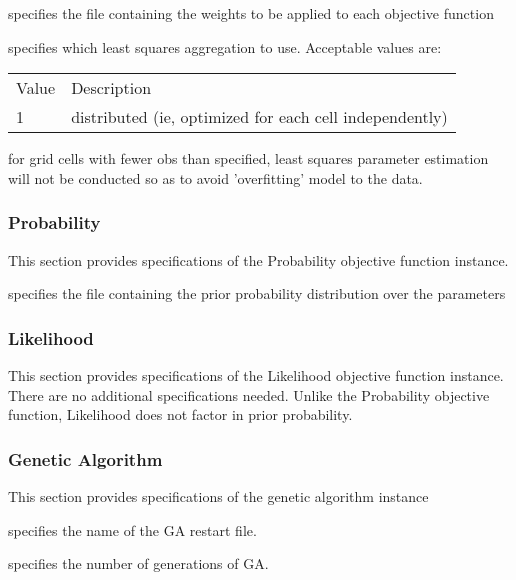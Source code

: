  
  specifies the file containing
 the weights to be applied to each objective function

  specifies which 
 least squares aggregation to use.
 Acceptable values are:

 \begin{tabular}{ll}
 Value & Description    \\
 1     & distributed (ie, optimized for each cell independently)  \\
 \end{tabular}

  for
 grid cells with fewer obs than specified, least squares parameter
 estimation will not be conducted so as to avoid 'overfitting' model to the data.
 

 
 \subsubsection{Probability} \label{sssec:probability}
 This section provides specifications of the Probability objective function
 instance.
 

 
  specifies the file containing the 
  prior probability distribution over the parameters
 

 
 \subsubsection{Likelihood} \label{sssec:likelihood}
 This section provides specifications of the Likelihood objective function
 instance.  There are no additional specifications needed.  Unlike the Probability
 objective function, Likelihood does not factor in prior probability.
 

 
 \subsubsection{Genetic Algorithm} \label{ssec:ga}
 This section provides specifications of the genetic algorithm instance
 

 
  specifies the name of the 
 GA restart file.

  specifies the 
 number of generations of GA.

